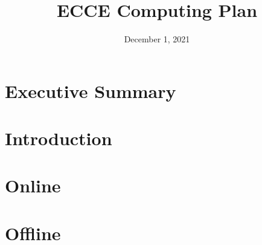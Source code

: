 \documentclass[12pt,twoside]{article}
\date{December 1, 2021}
\title{ECCE Computing Plan}
\begin{document}
\pagestyle{empty}


\cleardoublepage
\pagestyle{plain}
\maketitle
{}








\section* {Executive Summary}
\label{sec:ExecutiveSummary}


\clearpage
\setcounter{tocdepth}{3}
\tableofcontents
\clearpage
{}
\setcounter{page}{1}

\section {Introduction}
\label{sec:introduction}




%

\section {Online}
\label{sec:online}



\section {Offline}
\label{sec:offline}

\end{document}

